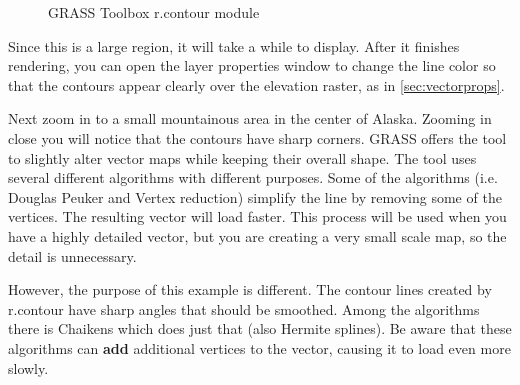 \begin{figure}[h]
\centering
\caption{GRASS Toolbox r.contour module \nixcaption}\label{fig:grass_toolbox_rcontour}
   \goodgap
   \goodgap
\end{figure}

Since this is a large region, it will take a while to display. After it
finishes rendering, you can open the layer properties window to change the
line color so that the contours appear clearly over the elevation raster, as
in \ref{sec:vectorprops}.

Next zoom in to a small mountainous area in the center of Alaska.
Zooming in close you will notice that the contours have sharp corners. GRASS
offers the  tool to slightly alter vector maps while
keeping their overall shape. The tool uses several different algorithms with
different purposes. Some of the algorithms (i.e. Douglas Peuker and Vertex
reduction) simplify the line by removing some of the vertices. The resulting
vector will load faster. This process will be used when you have a highly
detailed vector, but you are creating a very small scale map, so the detail
is unnecessary. 

\begin{Tip}\caption{\textsc{The simplify tool}}
\end{Tip}  

However, the purpose of this example is different. The contour lines created
by r.contour have sharp angles that should be smoothed. Among the
 algorithms there is Chaikens which does just that
(also Hermite splines). Be aware that these algorithms can \textbf{add}
additional vertices to the vector, causing it to load even more slowly.

